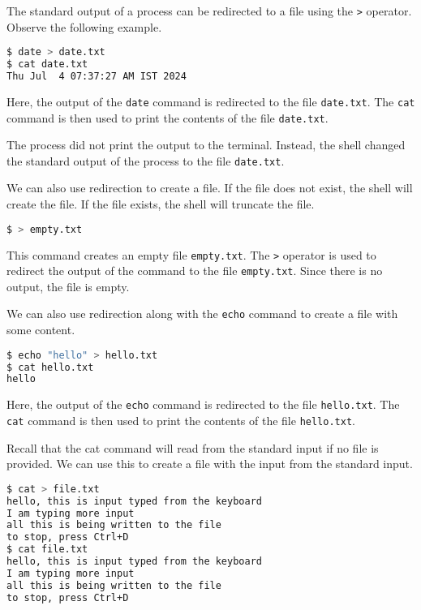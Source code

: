 The standard output of a process can be redirected to a file using the
\lstinline|>| operator. Observe the following example.

\begin{lstlisting}[language=bash]
$ date > date.txt
$ cat date.txt
Thu Jul  4 07:37:27 AM IST 2024
\end{lstlisting}

Here, the output of the \lstinline|date| command is redirected to the file
\lstinline|date.txt|. The \lstinline|cat| command is then used to print the
contents of the file \lstinline|date.txt|.

The process did not print the output to the terminal. Instead, the shell
changed the standard output of the process to the file \lstinline|date.txt|.

We can also use redirection to create a file. If the file does not exist,
the shell will create the file. If the file exists, the shell will truncate
the file.

\begin{lstlisting}[language=bash]
$ > empty.txt
\end{lstlisting}

This command creates an empty file \lstinline|empty.txt|. The \lstinline|>|
operator is used to redirect the output of the command to the file
\lstinline|empty.txt|. Since there is no output, the file is empty.

We can also use redirection along with the \lstinline|echo| command to
create a file with some content.

\begin{lstlisting}[language=bash]
$ echo "hello" > hello.txt
$ cat hello.txt
hello
\end{lstlisting}

Here, the output of the \lstinline|echo| command is redirected to the file
\lstinline|hello.txt|. The \lstinline|cat| command is then used to print the
contents of the file \lstinline|hello.txt|.

Recall that the cat command will read from the standard input if no
file is provided. We can use this to create a file with the input from
the standard input.

\begin{lstlisting}[language=bash]
$ cat > file.txt
hello, this is input typed from the keyboard
I am typing more input
all this is being written to the file
to stop, press Ctrl+D
$ cat file.txt
hello, this is input typed from the keyboard
I am typing more input
all this is being written to the file
to stop, press Ctrl+D
\end{lstlisting}


